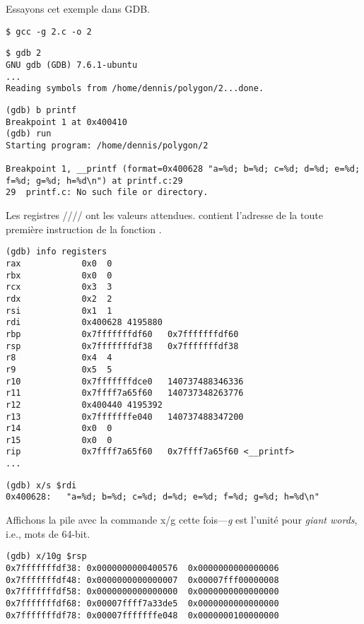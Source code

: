 Essayons cet exemple dans \ac{GDB}.

\begin{lstlisting}
$ gcc -g 2.c -o 2
\end{lstlisting}

\begin{lstlisting}
$ gdb 2
GNU gdb (GDB) 7.6.1-ubuntu
...
Reading symbols from /home/dennis/polygon/2...done.
\end{lstlisting}

\begin{lstlisting}[caption=mettons le point d'arrêt à \printf{,} et lançons]
(gdb) b printf
Breakpoint 1 at 0x400410
(gdb) run
Starting program: /home/dennis/polygon/2 

Breakpoint 1, __printf (format=0x400628 "a=%d; b=%d; c=%d; d=%d; e=%d; f=%d; g=%d; h=%d\n") at printf.c:29
29	printf.c: No such file or directory.
\end{lstlisting}

Les registres \RSI/\RDX/\RCX// ont les valeurs attendues.
\RIP contient l'adresse de la toute première instruction de la fonction \printf.

\begin{lstlisting}
(gdb) info registers
rax            0x0	0
rbx            0x0	0
rcx            0x3	3
rdx            0x2	2
rsi            0x1	1
rdi            0x400628	4195880
rbp            0x7fffffffdf60	0x7fffffffdf60
rsp            0x7fffffffdf38	0x7fffffffdf38
r8             0x4	4
r9             0x5	5
r10            0x7fffffffdce0	140737488346336
r11            0x7ffff7a65f60	140737348263776
r12            0x400440	4195392
r13            0x7fffffffe040	140737488347200
r14            0x0	0
r15            0x0	0
rip            0x7ffff7a65f60	0x7ffff7a65f60 <__printf>
...
\end{lstlisting}

\begin{lstlisting}[caption=inspectons la chaîne de format]
(gdb) x/s $rdi
0x400628:	"a=%d; b=%d; c=%d; d=%d; e=%d; f=%d; g=%d; h=%d\n"
\end{lstlisting}

Affichons la pile avec la commande x/g cette fois---\emph{g} est l'unité pour \emph{giant words}, i.e., mots de 64-bit.

\begin{lstlisting}
(gdb) x/10g $rsp
0x7fffffffdf38:	0x0000000000400576	0x0000000000000006
0x7fffffffdf48:	0x0000000000000007	0x00007fff00000008
0x7fffffffdf58:	0x0000000000000000	0x0000000000000000
0x7fffffffdf68:	0x00007ffff7a33de5	0x0000000000000000
0x7fffffffdf78:	0x00007fffffffe048	0x0000000100000000
\end{lstlisting}

